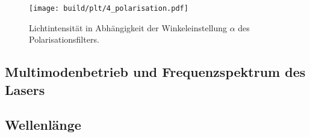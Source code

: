 \begin{figure}
  \centering
   \texttt{[image: build/plt/4\_polarisation.pdf]}
   \caption{Lichtintensität in Abhängigkeit der Winkeleinstellung $\alpha$ des Polarisationsfilters.}
   \label{fig:plt:polarisation}
\end{figure}


\subsection{Multimodenbetrieb und Frequenzspektrum des Lasers}


\subsection{Wellenlänge}
\lipsum[1]

